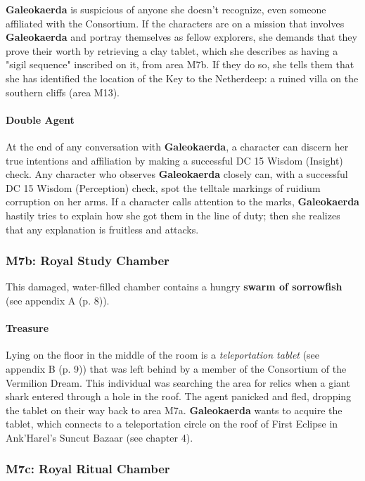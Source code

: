 \documentclass[letterpaper, 11pt, bg=full, twocolumn]{dndbook}
\begin{document}
\textbf{Galeokaerda} is suspicious of anyone she doesn't recognize, even someone affiliated with the Consortium. If the characters are on a mission that involves \textbf{Galeokaerda} and portray themselves as fellow explorers, she demands that they prove their worth by retrieving a clay tablet, which she describes as having a "sigil sequence" inscribed on it, from area M7b. If they do so, she tells them that she has identified the location of the Key to the Netherdeep: a ruined villa on the southern cliffs (area M13).

\paragraph{Double Agent}

At the end of any conversation with \textbf{Galeokaerda}, a character can discern her true intentions and affiliation by making a successful DC 15 Wisdom (Insight) check. Any character who observes \textbf{Galeokaerda} closely can, with a successful DC 15 Wisdom (Perception) check, spot the telltale markings of ruidium corruption on her arms. If a character calls attention to the marks, \textbf{Galeokaerda} hastily tries to explain how she got them in the line of duty; then she realizes that any explanation is fruitless and attacks.

\subsubsection{M7b: Royal Study Chamber}

This damaged, water-filled chamber contains a hungry \textbf{swarm of sorrowfish} (see appendix A (p. 8)).

\paragraph{Treasure}

Lying on the floor in the middle of the room is a \textit{teleportation tablet} (see appendix B (p. 9)) that was left behind by a member of the Consortium of the Vermilion Dream. This individual was searching the area for relics when a giant shark entered through a hole in the roof. The agent panicked and fled, dropping the tablet on their way back to area M7a. \textbf{Galeokaerda} wants to acquire the tablet, which connects to a teleportation circle on the roof of First Eclipse in Ank'Harel's Suncut Bazaar (see chapter 4).

\subsubsection{M7c: Royal Ritual Chamber}
\end{document}
